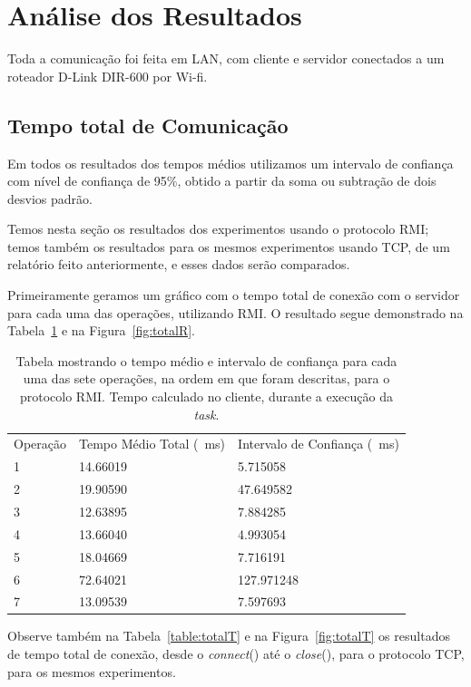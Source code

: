 \documentclass[12pt,a4paper]{article}
\begin{document}
\section{Análise dos Resultados}

Toda a comunicação foi feita em LAN, com cliente e servidor conectados a um roteador D-Link DIR-600 por Wi-fi.

\subsection{Tempo total de Comunicação}

Em todos os resultados dos tempos médios utilizamos um intervalo de confiança com nível de confiança de 95\%, obtido a partir da soma ou subtração de dois desvios padrão.

Temos nesta seção os resultados dos experimentos usando o protocolo RMI; temos também os resultados para os mesmos experimentos usando TCP, de um relatório feito anteriormente, e esses dados serão comparados.
    
Primeiramente geramos um gráfico com o tempo total de conexão com o servidor para cada uma das operações, utilizando RMI. O resultado segue demonstrado na Tabela~\ref{table:totalR} e na Figura~\ref{fig:totalR}.

\begin{table}[h]
\centering
\caption{Tabela mostrando o tempo médio e intervalo de confiança para cada uma das sete operações, na ordem em que foram descritas, para o protocolo RMI. Tempo calculado no cliente, durante a execução da {\it task}.}
\label{table:totalR}
\begin{tabular}{lll}
Operação & Tempo Médio Total (\SI{}{\milli\second})  & Intervalo de Confiança (\SI{}{\milli\second})           \\
1        & 14.66019          & 5.715058    \\
2        & 19.90590          & 47.649582   \\
3        & 12.63895          & 7.884285    \\
4        & 13.66040          & 4.993054    \\
5        & 18.04669          & 7.716191     \\
6        & 72.64021          & 127.971248  \\
7        & 13.09539          & 7.597693   
\end{tabular}
\end{table}

Observe também na Tabela~\ref{table:totalT} e na Figura~\ref{fig:totalT} os resultados de tempo total de conexão, desde o {\it connect}() até o {\it close}(), para o protocolo TCP, para os mesmos experimentos.
\end{document}
